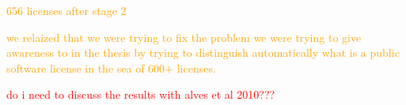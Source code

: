 \textcolor{orange}{656 licenses after stage 2}


\textcolor{orange}{we relaized that we were trying to fix the problem we were trying to give awareness to in the thesis by trying to distinguish automatically what is a public software license in the sea of 600+ licenses.}

\textcolor{red}{do i need to discuss the results with alves et al 2010???}